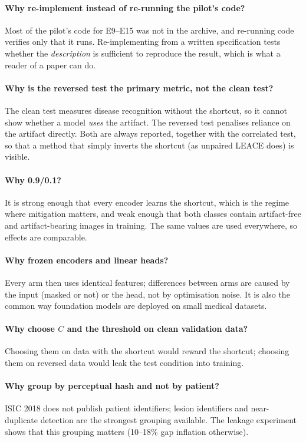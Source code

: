 \paragraph{Why re-implement instead of re-running the pilot's code?} Most of the pilot's code for E9--E15 was not in
the archive, and re-running code verifies only that it runs. Re-implementing from a written specification tests
whether the \emph{description} is sufficient to reproduce the result, which is what a reader of a paper can do.
\paragraph{Why is the reversed test the primary metric, not the clean test?} The clean test measures disease
recognition without the shortcut, so it cannot show whether a model \emph{uses} the artifact. The reversed test
penalises reliance on the artifact directly. Both are always reported, together with the correlated test, so that a
method that simply inverts the shortcut (as unpaired LEACE does) is visible.
\paragraph{Why 0.9/0.1?} It is strong enough that every encoder learns the shortcut, which is the regime where
mitigation matters, and weak enough that both classes contain artifact-free and artifact-bearing images in training.
The same values are used everywhere, so effects are comparable.
\paragraph{Why frozen encoders and linear heads?} Every arm then uses identical features; differences between arms
are caused by the input (masked or not) or the head, not by optimisation noise. It is also the common way foundation
models are deployed on small medical datasets.
\paragraph{Why choose $C$ and the threshold on clean validation data?} Choosing them on data with the shortcut would
reward the shortcut; choosing them on reversed data would leak the test condition into training.
\paragraph{Why group by perceptual hash and not by patient?} ISIC 2018 does not publish patient identifiers; lesion
identifiers and near-duplicate detection are the strongest grouping available. The leakage experiment shows that this
grouping matters (10--18\% gap inflation otherwise).
